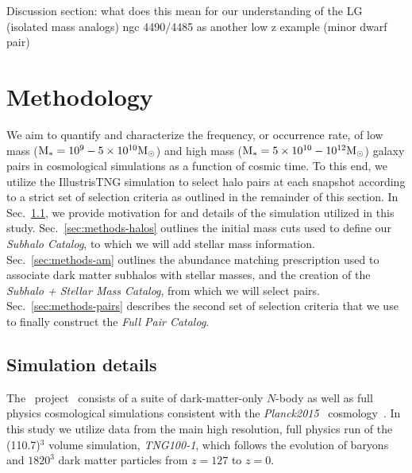 \documentclass[twocolumn]{aastex631}
\newcommand{\ms}[1]{\ensuremath{M_{*{#1}}}}
\newcommand{\subcat}{\textit{Subhalo Catalog}}
\newcommand{\starcat}{\textit{Subhalo + Stellar Mass Catalog}}
\newcommand{\paircat}{\textit{Full Pair Catalog}}
\begin{document}
Discussion section: 
what does this mean for our understanding of the LG (isolated mass analogs) 
ngc 4490/4485 as another low z example (minor dwarf pair) 


 \section{Methodology}\label{sec:methods}
We aim to quantify and characterize the frequency, or occurrence rate, of low mass ($\rm\ms{}=10^{9}-5\times 10^{10}\Msun$) and high mass ($\rm\ms{}=5\times10^{10}-10^{12}\Msun$) galaxy pairs in cosmological simulations as a function of cosmic time. 
To this end, we utilize the IllustrisTNG simulation to select halo pairs at each snapshot according to a strict set of selection criteria as outlined in the remainder of this section. 
In Sec.~\ref{sec:methods-sims}, we provide motivation for and details of the simulation utilized in this study.
Sec.~\ref{sec:methods-halos} outlines the initial mass cuts used to define our \subcat, to which we will 
add stellar mass information. %
Sec.~\ref{sec:methods-am} outlines the abundance matching prescription used to associate dark matter subhalos with stellar masses, and the creation of the \starcat, from which we will select pairs.
Sec.~\ref{sec:methods-pairs} describes the second set of selection criteria that we use to finally construct the \paircat. 


    \subsection{Simulation details} \label{sec:methods-sims}
    The \tng\ project~\citep{TNG1, TNG2, TNG3, TNG4, TNG5} consists of a suite of dark-matter-only $N$-body as well as full physics cosmological simulations consistent with the \textit{Planck2015} \lcdm\  cosmology~\citep{Planck2015}.
    In this study we utilize data from the main high resolution, full physics run of the (110.7\Mpc)$^3$ volume simulation, \textsl{TNG100-1}, which follows the evolution of baryons and $1820^3$ dark matter particles from $z=127$ to $z=0$. 
\end{document}
